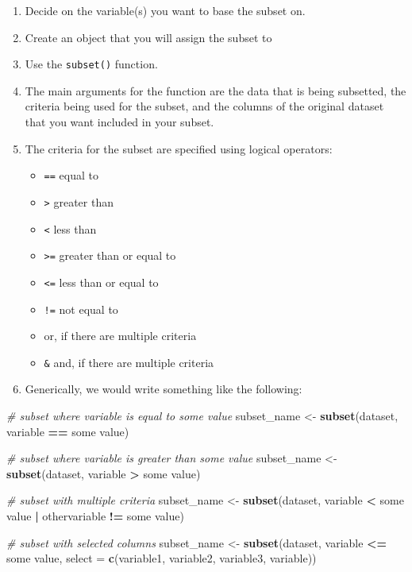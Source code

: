 \documentclass[
]{book}
\newenvironment{Shaded}{\begin{snugshade}}{\end{snugshade}}
\newcommand{\AttributeTok}[1]{\textcolor[rgb]{0.13,0.29,0.53}{#1}}
\newcommand{\CommentTok}[1]{\textcolor[rgb]{0.56,0.35,0.01}{\textit{#1}}}
\newcommand{\FunctionTok}[1]{\textcolor[rgb]{0.13,0.29,0.53}{\textbf{#1}}}
\newcommand{\NormalTok}[1]{#1}
\newcommand{\OtherTok}[1]{\textcolor[rgb]{0.56,0.35,0.01}{#1}}
\newcommand{\SpecialCharTok}[1]{\textcolor[rgb]{0.81,0.36,0.00}{\textbf{#1}}}
\providecommand{\tightlist}{%
  \setlength{\itemsep}{0pt}\setlength{\parskip}{0pt}}
\begin{document}
\begin{enumerate}
\def\labelenumi{\arabic{enumi}.}
\tightlist
\item
  Decide on the variable(s) you want to base the subset on.
\item
  Create an object that you will assign the subset to
\item
  Use the \texttt{subset()} function.
\item
  The main arguments for the function are the data that is being subsetted, the criteria being used for the subset, and the columns of the original dataset that you want included in your subset.
\item
  The criteria for the subset are specified using logical operators:

  \begin{itemize}
  \tightlist
  \item
    \texttt{==} equal to
  \item
    \texttt{\textgreater{}} greater than
  \item
    \texttt{\textless{}} less than
  \item
    \texttt{\textgreater{}=} greater than or equal to
  \item
    \texttt{\textless{}=} less than or equal to
  \item
    \texttt{!=} not equal to
  \item
    \texttt{\textbar{}} or, if there are multiple criteria
  \item
    \texttt{\&} and, if there are multiple criteria
  \end{itemize}
\item
  Generically, we would write something like the following:
\end{enumerate}

\begin{Shaded}
\begin{Highlighting}[]
\CommentTok{\# subset where variable is equal to some value}
\NormalTok{subset\_name }\OtherTok{\textless{}{-}} \FunctionTok{subset}\NormalTok{(dataset, variable }\SpecialCharTok{==}\NormalTok{ some value)}

\CommentTok{\# subset where variable is greater than some value}
\NormalTok{subset\_name }\OtherTok{\textless{}{-}} \FunctionTok{subset}\NormalTok{(dataset, variable }\SpecialCharTok{\textgreater{}}\NormalTok{ some value)}

\CommentTok{\# subset with multiple criteria}
\NormalTok{subset\_name }\OtherTok{\textless{}{-}} \FunctionTok{subset}\NormalTok{(dataset, variable }\SpecialCharTok{\textless{}}\NormalTok{ some value }\SpecialCharTok{|}
\NormalTok{                        othervariable }\SpecialCharTok{!=}\NormalTok{ some value)}

\CommentTok{\# subset with selected columns}
\NormalTok{subset\_name }\OtherTok{\textless{}{-}} \FunctionTok{subset}\NormalTok{(dataset, variable }\SpecialCharTok{\textless{}=}\NormalTok{ some value,}
                      \AttributeTok{select =} \FunctionTok{c}\NormalTok{(variable1, variable2, variable3, variable))}
\end{Highlighting}
\end{Shaded}
\end{document}
